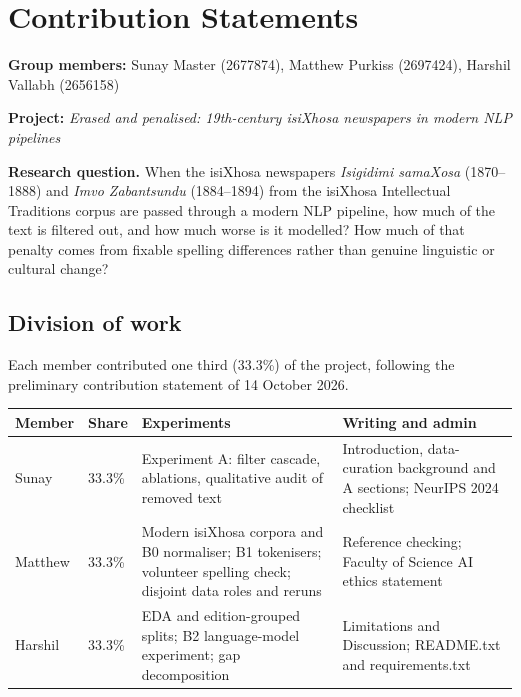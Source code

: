 \documentclass[10pt,letterpaper]{article}
\begin{document}
\onecolumn
\section{Contribution Statements}
\begingroup\setlength{\parindent}{0pt}\setlength{\parskip}{0.3em}\renewcommand{\itemize}{\begingroup\list{\textbullet}{\setlength{\itemsep}{1pt}\setlength{\parsep}{0pt}\setlength{\topsep}{2pt}}}\renewcommand{\enditemize}{\endlist\endgroup}

\textbf{Group members:} Sunay Master (2677874), Matthew Purkiss (2697424), Harshil Vallabh (2656158)

\textbf{Project:} \emph{Erased and penalised: 19th-century isiXhosa newspapers in modern NLP pipelines}

\textbf{Research question.} When the isiXhosa newspapers \emph{Isigidimi samaXosa} (1870--1888) and \emph{Imvo Zabantsundu} (1884--1894) from the isiXhosa Intellectual Traditions corpus \citep{schoots2023archive} are passed through a modern NLP pipeline, how much of the text is filtered out, and how much worse is it modelled? How much of that penalty comes from fixable spelling differences rather than genuine linguistic or cultural change?

\subsection{Division of work}

Each member contributed one third (33.3\%) of the project, following the preliminary contribution statement of 14 October 2026.

\begin{center}
\small
\begin{tabular}{@{}l l >{\raggedright\arraybackslash}p{} >{\raggedright\arraybackslash}p{}@{}}
\toprule
\textbf{Member} & \textbf{Share} & \textbf{Experiments} & \textbf{Writing and admin} \\
\midrule
Sunay & 33.3\% & Experiment A: filter cascade, ablations, qualitative audit of removed text & Introduction, data-curation background and A sections; NeurIPS 2024 checklist \\
\addlinespace
Matthew & 33.3\% & Modern isiXhosa corpora and B0 normaliser; B1 tokenisers; volunteer spelling check; disjoint data roles and reruns & Reference checking; Faculty of Science AI ethics statement \\
\addlinespace
Harshil & 33.3\% & EDA and edition-grouped splits; B2 language-model experiment; gap decomposition & Limitations and Discussion; README.txt and requirements.txt \\
\bottomrule
\end{tabular}
\end{center}
\end{document}
